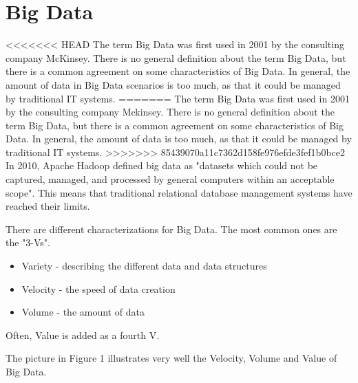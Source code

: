 \documentclass{acm_proc_article-sp}
\begin{document}
\section{Big Data}

<<<<<<< HEAD
The term Big Data was first used in 2001 by the consulting company McKinsey\cite{DBLP:series/sbcs/ChenMZL14}. There is no general definition about the term Big Data, but there is a common agreement on some characteristics of Big Data. In general, the amount of data in Big Data scenarios is too much, as that it could be managed by traditional IT systems.
=======
The term Big Data was first used in 2001 by the consulting company Mckinsey\cite{DBLP:series/sbcs/ChenMZL14}. There is no general definition about the term Big Data, but there is a common agreement on some characteristics of Big Data. In general, the amount of data is too much, as that it could be managed by traditional IT systems.
>>>>>>> 85439070a11c7362d158fe976efde3fef1b0bce2
In 2010, Apache Hadoop defined big data as "datasets which could not be
captured, managed, and processed by general computers within an acceptable
scope"\cite{DBLP:series/sbcs/ChenMZL14}. This means that traditional relational database management systems have reached their limits.

There are different characterizations for Big Data. The most common ones are the "3-Vs"\cite{bigdata-challenges}.
\begin{itemize}
	\item Variety - describing the different data and data structures
	\item Velocity - the speed of data creation
	\item Volume - the amount of data
\end{itemize}
Often, Value is added as a fourth V.

The picture in Figure 1 illustrates very well the Velocity, Volume and Value of Big Data.
\end{document}
